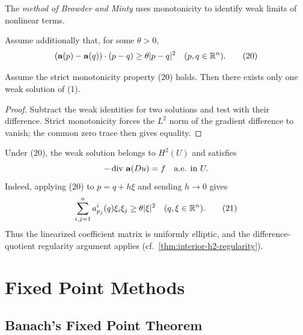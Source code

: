 \begin{remark}
\label{rem:browder-minty-method}

The \textit{method of Browder and Minty} uses monotonicity to identify weak limits of nonlinear terms.
\end{remark}

Assume additionally that, for some $\theta>0$,
\[
(\mathbf a(p)-\mathbf a(q))\cdot(p-q)\geq\theta|p-q|^2
\quad(p,q\in\mathbb{R}^n).
\tag{20}
\]

\begin{theorem}
\label{thm:monotonicity-uniqueness-weak-solution}

Assume the strict monotonicity property (20) holds. Then there exists only one weak solution of (1).
\end{theorem}

\begin{proof}
\sketch Subtract the weak identities for two solutions and test with their difference. Strict monotonicity forces the $L^2$ norm of the gradient difference to vanish; the common zero trace then gives equality.
\end{proof}

\begin{remark}
\label{rem:monotonicity-h2-regularity}

Under (20), the weak solution belongs to $H^2(U)$ and satisfies
\[
-\operatorname{div}\,\mathbf{a}(Du) = f \quad \text{a.e. in } U.
\]
Indeed, applying (20) to $p=q+h\xi$ and sending $h\to0$ gives
\[
\sum_{i,j=1}^{n} a^i_{p_j}(q)\xi_i\xi_j \geq \theta|\xi|^2 \quad (q, \xi \in \mathbb{R}^n).
\tag{21}
\]
Thus the linearized coefficient matrix is uniformly elliptic, and the difference-quotient regularity argument applies (cf.\ \cref{thm:interior-h2-regularity}).
\end{remark}

\section{Fixed Point Methods}
\label{sec:fixed-point-methods}

\subsection{Banach's Fixed Point Theorem}
\label{sec:banachs-fixed-point-theorem}

